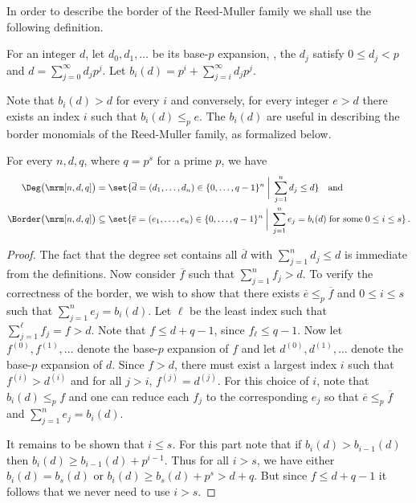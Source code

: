 In order to describe the border of the Reed-Muller family we shall use the following definition.
\begin{definition}\label{defn:bi}
For %
an
integer $d$, let $d_0,d_1,\ldots$ be its 
%
base-$p$ expansion, \ie, %
the $d_j$ satisfy   %
$0 \leq d_j < p$ and
$d = \sum_{j=0}^{\infty} d_j p^j$.
Let $b_i(d) = p^i + \sum_{j=i}^\infty d_j p^j$.
\end{definition}

Note that $b_i(d) > d$ for every $i$ and
conversely, for every integer $e > d$ there exists an index $i$ such
that $b_i(d) \leq_p e$.
%
The $b_i(d)$      %
are useful in describing
the border monomials of the Reed-Muller family, as formalized below.

\begin{proposition}
\label{prop:rmborder}
For every $n,d,q$, where $q=p^s$ for a prime $p$, we have
\begin{align*}
  \Deg\big(\mrm[n,d,q]\big) & =  \set{\overline d=(d_1,\ldots,d_n) \in \{0,\ldots,q-1\}^n \; \bigg| \; \sum_{j=1}^n d_j \leq d
} \quad\text{and}\\
\Border\big(\mrm[n,d,q]\big) & \subseteq 
\set{\overline e=(e_1,\ldots,e_n) \in \{0,\ldots,q-1\}^n \; \bigg| \;  \sum_{j=1}^n e_j = b_i(d) \; \text{for some} \; 0 \leq i \leq s   }\,.
\end{align*}
\end{proposition}

\begin{proof}
The fact that the degree set contains all ${\overline d}$
with $\sum_{j=1}^n d_j \leq d$ is immediate from the definitions.
Now consider ${\overline f}$ such that $\sum_{j=1}^n f_j > d$.
To verify the correctness of the border,
we wish to show that there exists ${\overline e} \leq_p
{\overline f}$ and $0 \leq i \leq s$ such that $\sum_{j=1}^n e_j =
b_i(d)$. Let $\ell$ be the least index such that $\sum_{j=1}^\ell
f_j = f > d$. Note that $f \leq d + q - 1$, since $f_\ell \leq
q - 1$. Now let $f^{(0)},f^{(1)},\ldots$ denote the
base-$p$ expansion of $f$ and let
$d^{(0)},d^{(1)},\ldots$ denote the base-$p$ expansion of $d$.
Since $f > d$, there must exist a largest index $i$ such that
$f^{(i)} > d^{(i)}$ and for all $j > i$, $f^{(j)} = d^{(j)}$.
For this choice of $i$, note that $b_i(d) \leq _p f$
and
one can reduce %
each $f_j$ to the corresponding $e_j$ %
so that
$\overline e \leq_p \overline f$ and $\sum_{j=1}^n e_j = b_i(d)$.

It remains to be shown that $i \leq s$. For this part
note that if $b_i(d) > b_{i-1}(d)$ then $b_i(d) \geq b_{i-1}(d) + p^{i-1}$.
Thus for all $i > s$, we have either $b_i(d) = b_s(d)$
or $b_i(d) \geq b_s(d) + p^s > d + q$. But since $f \leq d + q-1$
it follows that we never need to use $i > s$.
\end{proof}

